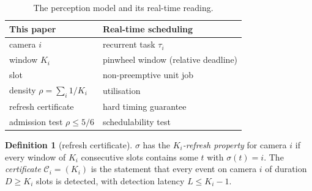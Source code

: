 \documentclass[final,5p,times,twocolumn]{elsarticle}
\theoremstyle{definition}
\newtheorem{definition}[theorem]{Definition}
\newcommand{\Ki}{K_i}
\newcommand{\dens}{\rho}
\newcommand{\sched}{\sigma}
\newcommand{\Dur}{D}
\newcommand{\Lat}{L}
\begin{document}
\begin{table}[t]
\centering
\caption{The perception model and its real-time reading.}
\label{tab:vocab}
\footnotesize\setlength{\tabcolsep}{5pt}
\begin{tabular}{ll}
\toprule
This paper & Real-time scheduling \\
\midrule
camera $i$ & recurrent task $\tau_i$ \\
window $\Ki$ & pinwheel window (relative deadline) \\
slot & non-preemptive unit job \\
density $\dens=\sum_i 1/\Ki$ & utilisation \\
refresh certificate & hard timing guarantee \\
admission test $\dens\le5/6$ & schedulability test \\
\bottomrule
\end{tabular}
\end{table}

\begin{definition}[refresh certificate]\label{def:refresh}
$\sched$ has the \emph{$\Ki$-refresh property} for camera $i$ if every window of $\Ki$ consecutive
slots contains some $t$ with $\sched(t)=i$. The \emph{certificate} $\mathcal{C}_i=(\Ki)$ is the
statement that every event on camera $i$ of duration $\Dur\ge\Ki$ slots is detected, with
detection latency $\Lat\le\Ki-1$.
\end{definition}
\end{document}
